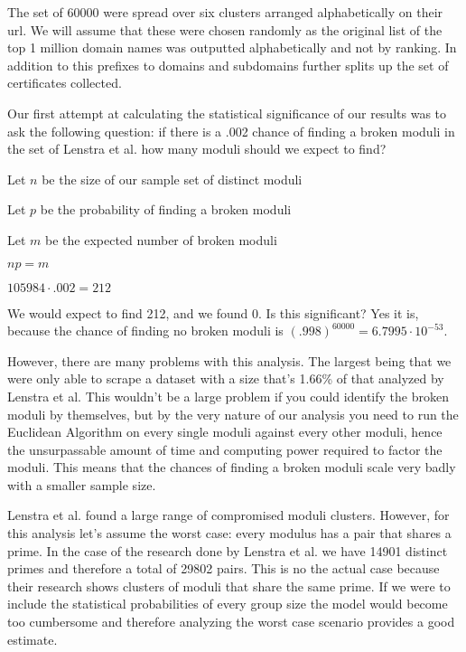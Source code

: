 \documentclass[11pt,twoside]{article}
\begin{document}
\begin{multicols}{2}
The set of 60000 were spread over six clusters arranged alphabetically on their
url. We will assume that these were chosen randomly as the original list of the
top 1 million domain names was outputted alphabetically and not by ranking. In
addition to this prefixes to domains and subdomains further splits up the set of
certificates collected. 

Our first attempt at calculating the statistical significance of our results was
to ask the following question: if there is a .002 chance of finding a broken
moduli in the set of Lenstra et al. how many moduli should we expect to find?

\begin{compactitem}
\item Let $n$ be the size of our sample set of distinct moduli
\item Let $p$ be the probability of finding a broken moduli
\item Let $m$ be the expected number of broken moduli
\item $np = m$
\item $105984 \cdot .002 = 212$
\end{compactitem}


We would expect to find 212, and we found 0. Is this significant? Yes it is,
because the chance of finding no broken moduli is $(.998)^{60 000} = 
6.7995\cdot10^{-53}$.

However, there are many problems with this analysis. The largest being that we
were only able to scrape a dataset with a size that's 1.66\% of that analyzed by
Lenstra et al. This wouldn't be a large problem if you could identify the broken
moduli by themselves, but by the very nature of our analysis you need to run the
Euclidean Algorithm on every single moduli against every other moduli, hence the
unsurpassable amount of time and computing power required to factor the moduli.
This means that the chances of finding a broken moduli scale very badly with a
smaller sample size. 

Lenstra et al. found a large range of compromised moduli clusters. However, for
this analysis let's assume the worst case: every modulus has a pair that shares
a prime. In the case of the research done by Lenstra et al. we have 14901
distinct primes and therefore a total of 29802 pairs. This is no the actual case
because their research shows clusters of moduli that share the same prime. If we
were to include the statistical probabilities of every group size the model
would become too cumbersome and therefore analyzing the worst case scenario
provides a good estimate.


\end{multicols}
\end{document}

